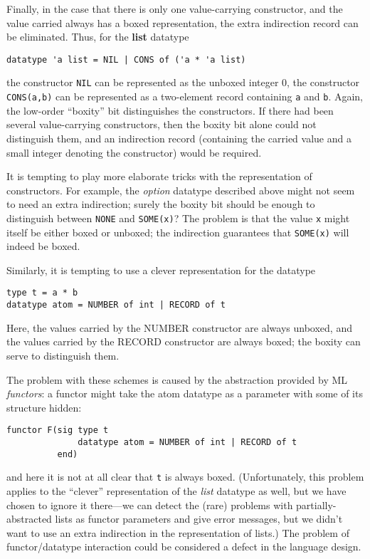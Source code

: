 Finally, in the case that there is only one value-carrying constructor,
and the value carried always has a boxed representation, the extra
indirection record can be eliminated.  Thus, for the {\bf list} datatype
\begin{verbatim}
datatype 'a list = NIL | CONS of ('a * 'a list)
\end{verbatim}
the constructor \verb"NIL" can be represented as the unboxed integer 0, the
constructor \verb"CONS(a,b)" can be represented as a two-element record
containing \verb"a" and \verb"b".  Again, the low-order ``boxity'' bit
distinguishes the constructors.  If there had been several value-carrying
constructors, then the boxity bit alone could not distinguish them,
and an indirection record (containing the carried value and a small
integer denoting the constructor) would be required.

It is tempting to play more elaborate tricks with the representation of
constructors.  For example, the {\em option} datatype described above
might not seem to need an extra indirection; surely the boxity bit
should be enough to distinguish between \verb"NONE" and \verb"SOME(x)"?
The problem is that the value \verb"x" might itself be either boxed or
unboxed; the indirection guarantees that \verb"SOME(x)" will indeed be boxed.

Similarly, it is tempting to use a clever representation for the datatype
\begin{verbatim}
type t = a * b
datatype atom = NUMBER of int | RECORD of t
\end{verbatim}
Here, the values carried by the NUMBER constructor are always unboxed, and
the values carried by the RECORD constructor are always boxed; the
boxity can serve to distinguish them.

The problem with these schemes is caused by the abstraction provided by
ML {\em functors}:
a functor might take the atom datatype as a parameter
with some of its structure hidden:
\begin{verbatim}
functor F(sig type t
              datatype atom = NUMBER of int | RECORD of t
          end)
\end{verbatim}
and here it is not at all clear that \verb"t" is always boxed.
(Unfortunately, this problem applies to the ``clever'' representation of the {\em list}
datatype as well, but we have chosen to ignore it there---we can
detect the (rare) problems with partially-abstracted lists
as functor parameters and give error messages, but we didn't want
to use an extra indirection in the representation of lists.)
The problem of functor/datatype interaction 
could be considered a defect in the language design.

